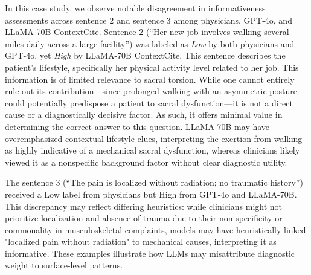 \documentclass[11pt]{article}
\begin{document}
In this case study, we observe notable disagreement in informativeness assessments across sentence 2 and sentence 3 among physicians, GPT-4o, and LLaMA-70B ContextCite. Sentence 2 (“Her new job involves walking several miles daily across a large facility”) was labeled as \textit{Low} by both physicians and GPT-4o, yet \textit{High} by LLaMA-70B ContextCite. This sentence describes the patient’s lifestyle, specifically her physical activity level related to her job. This information is of limited relevance to sacral torsion. While one cannot entirely rule out its contribution—since prolonged walking with an asymmetric posture could potentially predispose a patient to sacral dysfunction—it is not a direct cause or a diagnostically decisive factor. As such, it offers minimal value in determining the correct answer to this question. LLaMA-70B may have overemphasized contextual lifestyle clues, interpreting the exertion from walking as highly indicative of a mechanical sacral dysfunction, whereas clinicians likely viewed it as a nonspecific background factor without clear diagnostic utility. 

The sentence 3 (“The pain is localized without radiation; no traumatic history”) received a Low label from physicians but High from GPT-4o and LLaMA-70B. This discrepancy may reflect differing heuristics: while clinicians might not prioritize localization and absence of trauma due to their non-specificity or commonality in musculoskeletal complaints, models may have heuristically linked "localized pain without radiation" to mechanical causes, interpreting it as informative. These examples illustrate how LLMs may misattribute diagnostic weight to surface-level patterns.


\clearpage
\clearpage
\end{document}
